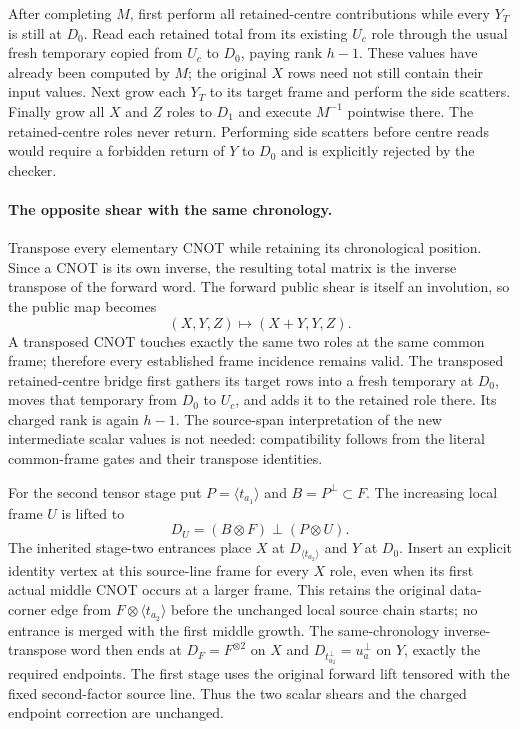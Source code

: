 After completing $M$, first perform all retained-centre contributions while
every $Y_T$ is still at $D_0$. Read each retained total from its existing $U_c$
role through the usual fresh temporary copied from $U_c$ to $D_0$, paying rank
$h-1$. These values have already been computed by $M$; the original $X$ rows
need not still contain their input values. Next grow each $Y_T$ to its target
frame and perform the side scatters. Finally grow all $X$ and $Z$ roles to
$D_1$ and execute $M^{-1}$ pointwise there. The retained-centre roles never
return. Performing side scatters before centre reads would require a forbidden
return of $Y$ to $D_0$ and is explicitly rejected by the checker.

\paragraph{The opposite shear with the same chronology.}
Transpose every elementary CNOT while retaining its chronological position.
Since a CNOT is its own inverse, the resulting total matrix is the
inverse transpose of the forward word. The forward public shear is itself an
involution, so the public map becomes
\[
 (X,Y,Z)\longmapsto(X+Y,Y,Z).
\]
A transposed CNOT touches exactly the same two roles at the same common frame;
therefore every established frame incidence remains valid. The transposed
retained-centre bridge first gathers its target rows into a fresh temporary at
$D_0$, moves that temporary from $D_0$ to $U_c$, and adds it to the retained
role there. Its charged rank is again $h-1$. The source-span interpretation of
the new intermediate scalar values is not needed: compatibility follows from
the literal common-frame gates and their transpose identities.

For the second tensor stage put $P=\langle t_{a_1}\rangle$ and
$B=P^\perp\subset F$. The increasing local frame $U$ is lifted to
\[
 D_U=(B\otimes F)\mathbin{\perp}(P\otimes U).
\]
The inherited stage-two entrances place $X$ at $D_{\langle t_{a_2}\rangle}$
and $Y$ at $D_0$. Insert an explicit identity vertex at this source-line frame
for every $X$ role, even when its first actual middle CNOT occurs at a larger
frame. This retains the original data-corner edge from $F\otimes
\langle t_{a_2}\rangle$ before the unchanged local source chain starts;
no entrance is merged with the first middle growth. The same-chronology inverse-transpose word then ends at
$D_F=F^{\otimes2}$ on $X$ and
$D_{t_{a_2}^\perp}=u_a^\perp$ on $Y$, exactly the required endpoints.
The first stage uses the original forward lift tensored with the fixed
second-factor source line. Thus the two scalar shears and the charged endpoint
correction are unchanged.

